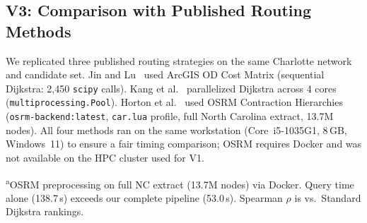 \documentclass[conference]{IEEEtran}
\begin{document}
\subsection{V3: Comparison with Published Routing Methods}
\label{sec:v3}

We replicated three published routing strategies on the same Charlotte network and candidate set.  Jin and Lu~\cite{Jin2022} used ArcGIS OD Cost Matrix (sequential Dijkstra: 2{,}450 \texttt{scipy} calls).  Kang et al.~\cite{Kang2020} parallelized Dijkstra across 4 cores (\texttt{multiprocessing.Pool}).  Horton et al.~\cite{Horton2025} used OSRM Contraction Hierarchies~\cite{Luxen2011} (\texttt{osrm-backend:latest}, \texttt{car.lua} profile, full North Carolina extract, 13.7M nodes).  All four methods ran on the same workstation (Core~i5-1035G1, 8\,GB, Windows~11) to ensure a fair timing comparison; OSRM requires Docker and was not available on the HPC cluster used for V1.

\begin{table}[!t]
\centering
\caption{V3: Routing Method Comparison (Charlotte, 559 BGs, 2,450 cands, 282,751 nodes)}
\label{tab:v3_comparison}
\small
{}
\vspace{2pt}
\footnotesize\textsuperscript{a}OSRM preprocessing on full NC extract (13.7M nodes) via Docker.  Query time alone (138.7\,s) exceeds our complete pipeline (53.0\,s).  Spearman $\rho$ is vs.\ Standard Dijkstra rankings.
\end{table}
\end{document}
